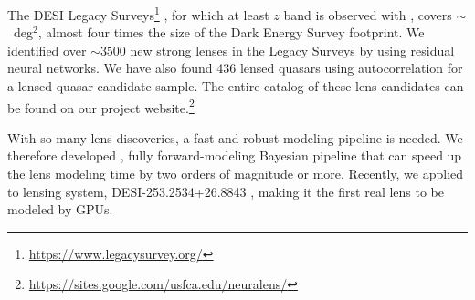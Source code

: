 The DESI Legacy Surveys\footnote{\url{https://www.legacysurvey.org/}}
\citep{dey2019a},
for which at least $z$ band is observed with ,
covers $\sim$\coverage~deg$^2$,
almost four times the size of the Dark Energy Survey \citep{des2005a} footprint.
We identified over $\sim 3500$ new strong lenses in the Legacy Surveys \citep[][respectively; henceforth, H20, H21, S24]{huang2020a, huang2021a, storfer2024a} by using residual neural networks. 
We have also found 436 lensed quasars \citep{dawes2023a} using autocorrelation for a lensed quasar candidate sample.
The entire catalog of these lens candidates can be found on our project website.\footnote{\url{https://sites.google.com/usfca.edu/neuralens/}}

With so many lens discoveries,
a fast and robust
modeling pipeline is needed.
We therefore developed \gigal \citep{gu2022a}, fully forward-modeling Bayesian pipeline that can speed up the lens modeling time by two orders of magnitude or more. 
Recently, we applied \gigal to  lensing system, 
DESI-253.2534+26.8843 \citep{cikota2023a}, 
making it the first real lens to be modeled by GPUs.


